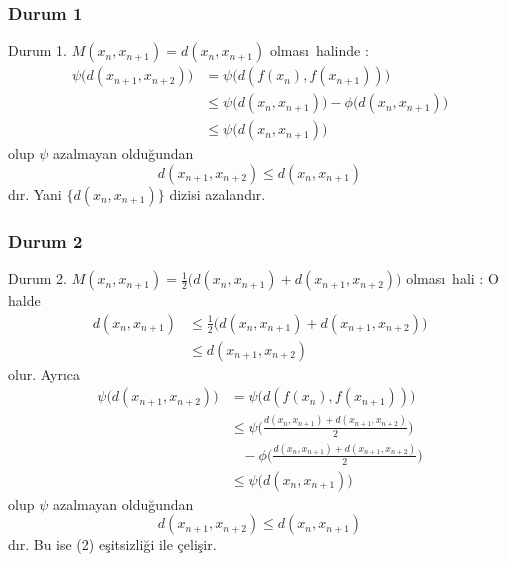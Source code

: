 \documentclass[8pt]{beamer}
\begin{document}
\subsubsection{Durum 1}
\begin{frame}
  \begin{block}{Durum 1. $M(x_n,x_{n+1})=d(x_n,x_{n+1})$ olmas\i\ halinde :}
      \begin{align*}
          \psi\big(d(x_{n+1},x_{n+2})\big)&=\psi \big(d(f(x_{n}),f(x_{n+1}))\big)\\
          &\leq \psi\big(d(x_{n},x_{n+1})\big)- \phi\big(d(x_{n},x_{n+1})\big)\\
          &\leq \psi\big(d(x_{n},x_{n+1})\big)
      \end{align*}
olup $\psi$ azalmayan oldu\u{g}undan $$d(x_{n+1},x_{n+2})\leq d(x_n,x_{n+1})$$ d\i r. Yani $\{d(x_n,x_{n+1})\}$ dizisi azaland\i r.
   \end{block}
\end{frame}%


\subsubsection{Durum 2} 
\begin{frame} 
  \begin{block}{Durum 2.  $M(x_n,x_{n+1})=\frac{1}{2}\big(d(x_n,x_{n+1})+d(x_{n+1},x_{n+2})\big)$ olmas\i\ hali :}
O halde 
      \begin{align}
        d(x_n,x_{n+1})&\leq \frac{1}{2}\big(d(x_n,x_{n+1})+d(x_{n+1},x_{n+2})\big)\\
                    &\leq d(x_{n+1},x_{n+2}) 
      \end{align}
olur. Ayr\i ca 
      \begin{align}
          \psi\big(d(x_{n+1},x_{n+2})\big) &=\psi \big(d(f(x_{n}),f(x_{n+1}))\big) \\
          &\leq \psi\bigg(\frac{d(x_n,x_{n+1})+d(x_{n+1},x_{n+2})}{2}\bigg) \\
          & \hspace{10pt}- \phi\bigg(\frac{d(x_n,x_{n+1})+d(x_{n+1},x_{n+2})}{2}\bigg) \\
          &\leq \psi\big(d(x_{n},x_{n+1})\big)
      \end{align}
olup $\psi $ azalmayan oldu\u{g}undan $$d(x_{n+1},x_{n+2})\leq d(x_n,x_{n+1})$$ d\i r. Bu ise (2) e\c{s}itsizli\u{g}i ile \c{c}eli\c{s}ir.
   \end{block}
\end{frame}%
\end{document}
